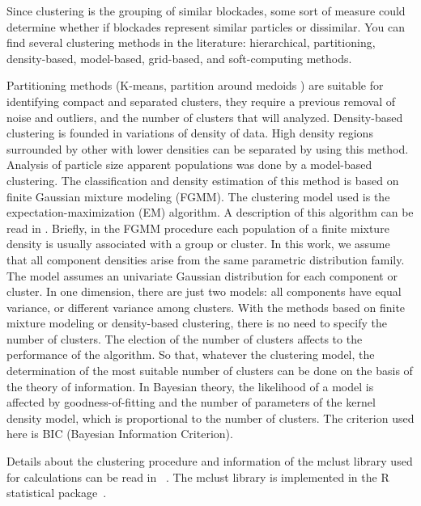 \documentclass[journal=langd5,manuscript=article]{achemso}
\begin{document}
Since clustering is the grouping of similar blockades, some sort of measure could determine whether if blockades represent similar particles or dissimilar. You can find several  clustering methods in the literature:  hierarchical,  partitioning,  density-based,  model-based,  grid-based, and  soft-computing  methods. 
% 
% 

Partitioning methods (K-means, partition around medoids ) are suitable for identifying  compact and separated clusters, they require a previous removal of noise and outliers, and the number of clusters that will analyzed. 
Density-based clustering is founded in variations of density of data. High density regions surrounded by other with lower densities can be separated by using this method. 
Analysis of particle size apparent populations was done by a model-based clustering. The classification and density estimation of this method is based on finite Gaussian mixture modeling (FGMM).  The clustering model used is the expectation-maximization (EM) algorithm. A description  of this algorithm can be read in 
\citeauthor{Do2008}  
% 
% 
\citeyear{Do2008}
\cite{Do2008}. Briefly, in the FGMM procedure each population of a finite  mixture density is usually associated with a group or cluster. In this work, we assume that all component densities arise from the same parametric distribution family. The model assumes an univariate Gaussian distribution for each component or cluster. In one dimension, there are just two models: all components have equal variance, or different variance among clusters.
With the methods based on finite mixture modeling or density-based clustering, there is no need to specify the number of clusters. The election of the number of clusters affects to the performance of the algorithm. So that, whatever the clustering model, the
determination of the most suitable number of clusters can be done on the basis of the theory of information. In Bayesian
theory, the likelihood of a model is affected by goodness-of-fitting and the number of parameters of the kernel density model, which is proportional to
the number of clusters.  The criterion used here is
BIC (Bayesian Information Criterion).

Details about the clustering procedure and information of the mclust library used for calculations can be read in 
~\citeauthor{Fraley2012MclustEstimation}\cite{Fraley2012MclustEstimation}. The mclust library is implemented in the R statistical package~\cite{RCoreTeam2011}.
\end{document}
